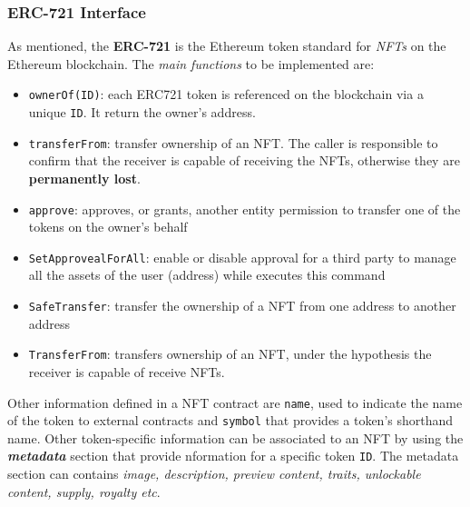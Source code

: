 \documentclass[10pt,a4paper]{report}
\begin{document}
\subsubsection{ERC-721 Interface}\label{sec:erc-721-interface}
As mentioned, the \textbf{ERC-721} is the Ethereum token standard for \textit{NFTs} on the Ethereum blockchain. The \textit{main functions} to be implemented are:
\begin{itemize}
	\item 
	\texttt{ownerOf(ID)}: each ERC721 token is referenced on the blockchain via a unique \texttt{ID}. It return the owner's address.
	\item 
	\texttt{transferFrom}: transfer ownership of an NFT. The caller is responsible to confirm that the receiver is capable of receiving the NFTs, otherwise they are \textbf{permanently lost}.
	\item 
	\texttt{approve}: approves, or grants, another entity permission to transfer one of the tokens on the owner’s behalf
	\item 
	\texttt{SetApprovealForAll}: enable or disable approval for a third party to manage all the assets of the user (address) while executes this command
	\item 
	\texttt{SafeTransfer}: transfer the ownership of a NFT from one address to another address
	\item 
	\texttt{TransferFrom}: transfers ownership of an NFT, under the hypothesis the receiver is capable of receive NFTs.
\end{itemize}

Other information defined in a NFT contract are \texttt{name}, used to indicate the name of the token to external contracts and \texttt{symbol} that provides a token's shorthand name.
Other token-specific information can be associated to an NFT by using the \textit{\textbf{metadata}} section that provide nformation for a specific token \texttt{ID}. The metadata section can contains \textit{image, description, preview content, traits, unlockable content, supply, royalty etc}.
\end{document}

